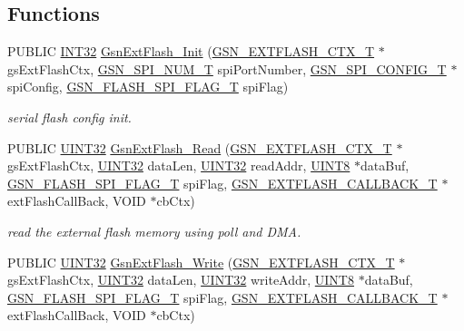 \subsection*{Functions}
\begin{DoxyCompactItemize}
\item 
PUBLIC \hyperlink{a00660_ga63021d67d54286c2163bcdb43a6f2569}{INT32} \hyperlink{a00664_gadcfa064597618fbf7cb4c1bac30f4bc8}{GsnExtFlash\_\-Init} (\hyperlink{a00071}{GSN\_\-EXTFLASH\_\-CTX\_\-T} $\ast$gsExtFlashCtx, \hyperlink{a00587_a8158d263babcdfe1b3b113e23acd1bf7}{GSN\_\-SPI\_\-NUM\_\-T} spiPortNumber, \hyperlink{a00231}{GSN\_\-SPI\_\-CONFIG\_\-T} $\ast$spiConfig, \hyperlink{a00496_ae69f658e2fd080c54a78eb23e4be2f59}{GSN\_\-FLASH\_\-SPI\_\-FLAG\_\-T} spiFlag)
\begin{DoxyCompactList}\small\item\em serial flash config init. \end{DoxyCompactList}\item 
PUBLIC \hyperlink{a00660_gae1e6edbbc26d6fbc71a90190d0266018}{UINT32} \hyperlink{a00664_ga969314425ebd66d21301f5e2a681dee3}{GsnExtFlash\_\-Read} (\hyperlink{a00071}{GSN\_\-EXTFLASH\_\-CTX\_\-T} $\ast$gsExtFlashCtx, \hyperlink{a00660_gae1e6edbbc26d6fbc71a90190d0266018}{UINT32} dataLen, \hyperlink{a00660_gae1e6edbbc26d6fbc71a90190d0266018}{UINT32} readAddr, \hyperlink{a00660_gab27e9918b538ce9d8ca692479b375b6a}{UINT8} $\ast$dataBuf, \hyperlink{a00496_ae69f658e2fd080c54a78eb23e4be2f59}{GSN\_\-FLASH\_\-SPI\_\-FLAG\_\-T} spiFlag, \hyperlink{a00496_a501e29be4c0f8b2ab5c186eb8deb8874}{GSN\_\-EXTFLASH\_\-CALLBACK\_\-T} $\ast$extFlashCallBack, VOID $\ast$cbCtx)
\begin{DoxyCompactList}\small\item\em read the external flash memory using poll and DMA. \end{DoxyCompactList}\item 
PUBLIC \hyperlink{a00660_gae1e6edbbc26d6fbc71a90190d0266018}{UINT32} \hyperlink{a00664_ga1e65016bc9bc6e7f219148b64b94213e}{GsnExtFlash\_\-Write} (\hyperlink{a00071}{GSN\_\-EXTFLASH\_\-CTX\_\-T} $\ast$gsExtFlashCtx, \hyperlink{a00660_gae1e6edbbc26d6fbc71a90190d0266018}{UINT32} dataLen, \hyperlink{a00660_gae1e6edbbc26d6fbc71a90190d0266018}{UINT32} writeAddr, \hyperlink{a00660_gab27e9918b538ce9d8ca692479b375b6a}{UINT8} $\ast$dataBuf, \hyperlink{a00496_ae69f658e2fd080c54a78eb23e4be2f59}{GSN\_\-FLASH\_\-SPI\_\-FLAG\_\-T} spiFlag, \hyperlink{a00496_a501e29be4c0f8b2ab5c186eb8deb8874}{GSN\_\-EXTFLASH\_\-CALLBACK\_\-T} $\ast$extFlashCallBack, VOID $\ast$cbCtx)

\end{DoxyCompactItemize}
